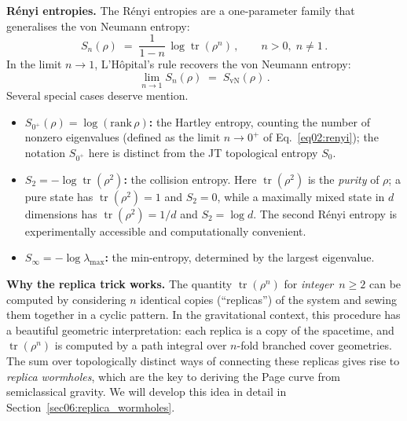 \documentclass[11pt,letterpaper]{article}
\theoremstyle{plain}
\theoremstyle{definition}
\theoremstyle{remark}
\DeclareMathOperator{\tr}{tr}
\begin{document}
\medskip
\noindent\textbf{R\'{e}nyi entropies.}
The R\'{e}nyi entropies are a one-parameter family that generalises the von Neumann
entropy:
\begin{equation}\label{eq02:renyi}
  S_n(\rho) \;=\; \frac{1}{1-n}\,\log\tr(\rho^n)\,,
  \qquad n > 0,\; n\neq 1\,.
\end{equation}
In the limit $n\to 1$, L'H\^{o}pital's rule recovers the von Neumann entropy:
\begin{equation}\label{eq02:renyi_limit}
  \lim_{n\to 1} S_n(\rho) \;=\; S_{\mathrm{vN}}(\rho)\,.
\end{equation}
Several special cases deserve mention.

\begin{itemize}[itemsep=2pt]
\item \textbf{$S_{0^+}(\rho) = \log(\text{rank}\,\rho)$:} the Hartley entropy, counting the
number of nonzero eigenvalues (defined as the limit $n \to 0^+$ of
Eq.~\eqref{eq02:renyi}); the notation $S_{0^+}$ here is distinct from the
JT topological entropy $S_0$.
\item \textbf{$S_2 = -\log\tr(\rho^2)$:} the collision entropy.  Here
$\tr(\rho^2)$ is the \emph{purity} of $\rho$; a pure state has $\tr(\rho^2)=1$
and $S_2=0$, while a maximally mixed state in $d$ dimensions has $\tr(\rho^2)=1/d$
and $S_2=\log d$.  The second R\'{e}nyi entropy is experimentally accessible
\cite{islametal2015} and computationally convenient.
\item \textbf{$S_\infty = -\log\lambda_{\max}$:} the min-entropy, determined by the
largest eigenvalue.
\end{itemize}

\medskip
\noindent\textbf{Why the replica trick works.}
The quantity $\tr(\rho^n)$ for \emph{integer}~$n\geq 2$ can be computed by considering
$n$ identical copies (``replicas'') of the system and sewing them together in a cyclic
pattern.  In the gravitational context, this procedure has a beautiful geometric
interpretation: each replica is a copy of the spacetime, and $\tr(\rho^n)$ is computed
by a path integral over $n$-fold branched cover geometries.  The sum over topologically
distinct ways of connecting these replicas gives rise to \emph{replica wormholes}, which
are the key to deriving the Page curve from semiclassical gravity.  We will develop
this idea in detail in Section~\ref{sec06:replica_wormholes}.
\end{document}
